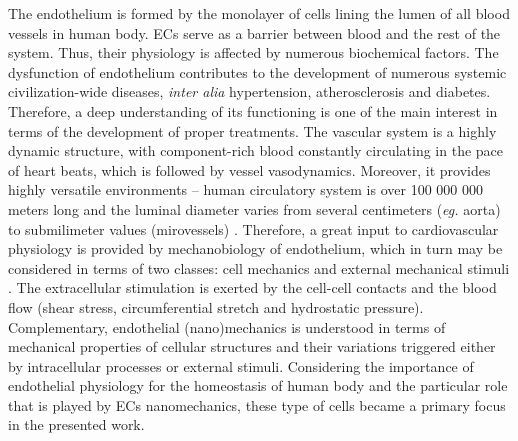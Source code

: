 The endothelium is formed by the monolayer of cells lining the lumen of all blood vessels in human body. \Glspl{EC} serve as a barrier between blood and the rest of the system. Thus, their physiology is affected by numerous biochemical factors. The dysfunction of endothelium contributes to the development of numerous systemic civilization-wide diseases, \emph{inter alia} hypertension, atherosclerosis and diabetes. Therefore, a deep understanding of its functioning is one of the main interest in terms of the development of proper treatments. The vascular system is a highly dynamic structure, with component-rich blood constantly circulating in the pace of heart beats, which is followed by vessel vasodynamics. Moreover, it provides highly versatile environments -- human circulatory system is over 100 000 000 meters long and the luminal diameter varies from several centimeters (\emph{eg.} aorta) to submilimeter values (mirovessels) \cite{Loe2004, Fu2013}. Therefore, a great input to cardiovascular physiology is provided by mechanobiology of endothelium, which in turn may be considered in terms of two classes: cell mechanics and external mechanical stimuli \cite{Fels2014}. The extracellular stimulation is exerted by the cell-cell contacts and the blood flow (shear stress, circumferential stretch and hydrostatic pressure). Complementary, endothelial (nano)mechanics is understood in terms of mechanical properties of cellular structures and their variations triggered either by intracellular processes or external stimuli. Considering the importance of endothelial physiology for the homeostasis of human body and the particular role that is played by \glspl{EC} nanomechanics, these type of cells became a primary focus in the presented work.

